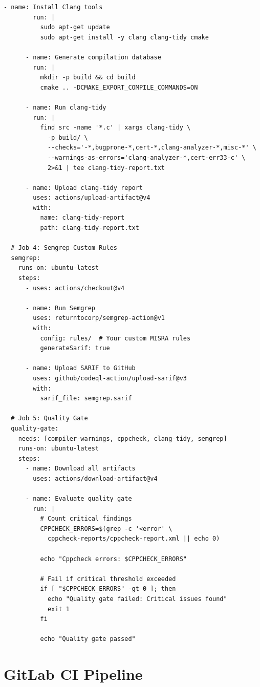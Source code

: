 \documentclass[11pt,letterpaper]{report}
\begin{document}
\begin{lstlisting}[style=yamlstyle]
      - name: Install Clang tools
        run: |
          sudo apt-get update
          sudo apt-get install -y clang clang-tidy cmake

      - name: Generate compilation database
        run: |
          mkdir -p build && cd build
          cmake .. -DCMAKE_EXPORT_COMPILE_COMMANDS=ON

      - name: Run clang-tidy
        run: |
          find src -name '*.c' | xargs clang-tidy \
            -p build/ \
            --checks='-*,bugprone-*,cert-*,clang-analyzer-*,misc-*' \
            --warnings-as-errors='clang-analyzer-*,cert-err33-c' \
            2>&1 | tee clang-tidy-report.txt

      - name: Upload clang-tidy report
        uses: actions/upload-artifact@v4
        with:
          name: clang-tidy-report
          path: clang-tidy-report.txt

  # Job 4: Semgrep Custom Rules
  semgrep:
    runs-on: ubuntu-latest
    steps:
      - uses: actions/checkout@v4

      - name: Run Semgrep
        uses: returntocorp/semgrep-action@v1
        with:
          config: rules/  # Your custom MISRA rules
          generateSarif: true

      - name: Upload SARIF to GitHub
        uses: github/codeql-action/upload-sarif@v3
        with:
          sarif_file: semgrep.sarif

  # Job 5: Quality Gate
  quality-gate:
    needs: [compiler-warnings, cppcheck, clang-tidy, semgrep]
    runs-on: ubuntu-latest
    steps:
      - name: Download all artifacts
        uses: actions/download-artifact@v4

      - name: Evaluate quality gate
        run: |
          # Count critical findings
          CPPCHECK_ERRORS=$(grep -c '<error' \
            cppcheck-reports/cppcheck-report.xml || echo 0)

          echo "Cppcheck errors: $CPPCHECK_ERRORS"

          # Fail if critical threshold exceeded
          if [ "$CPPCHECK_ERRORS" -gt 0 ]; then
            echo "Quality gate failed: Critical issues found"
            exit 1
          fi

          echo "Quality gate passed"
\end{lstlisting}

\section{GitLab CI Pipeline}
\end{document}
